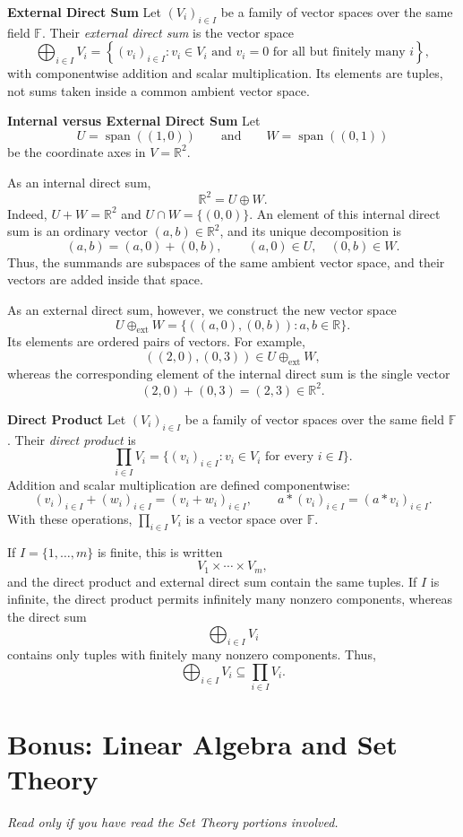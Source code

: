 \documentclass[a4paper,11pt,abstract=true]{scrartcl}
\theoremstyle{dotlessP}
\theoremstyle{dotlessS}
\theoremstyle{remark}
\theoremstyle{definition}
\begin{document}
\textbf{External Direct Sum} Let ${(V_i)}_{i\in I}$ be a family
of vector spaces over the same field $\mathbb{F}$. Their \emph{external direct sum} is
the vector space
\[
\bigoplus_{i\in I}V_i
=\left\{{(v_i)}_{i\in I}:v_i\in V_i
\text{ and }v_i=0\text{ for all but finitely many }i\right\},
\]
with componentwise addition and scalar multiplication. Its elements are
tuples, not sums taken inside a common ambient vector space.

\textbf{Internal versus External Direct Sum} Let
\[
U=\operatorname{span}((1,0))
\qquad\text{and}\qquad
W=\operatorname{span}((0,1))
\]
be the coordinate axes in $V=\mathbb{R}^2$.

As an internal direct sum,
\[
\mathbb{R}^2=U\oplus W.
\]
Indeed, $U+W=\mathbb{R}^2$ and $U\cap W=\{(0,0)\}$. An element of this
internal direct sum is an ordinary vector $(a,b)\in\mathbb{R}^2$, and its
unique decomposition is
\[
(a,b)=(a,0)+(0,b),
\qquad (a,0)\in U,\quad (0,b)\in W.
\]
Thus, the summands are subspaces of the same ambient vector space, and their
vectors are added inside that space.

As an external direct sum, however, we construct the new vector space
\[
U\oplus_{\mathrm{ext}}W
=\{((a,0),(0,b)):a,b\in\mathbb{R}\}.
\]
Its elements are ordered pairs of vectors. For example,
\[
((2,0),(0,3))\in U\oplus_{\mathrm{ext}}W,
\]
whereas the corresponding element of the internal direct sum is the single
vector
\[
(2,0)+(0,3)=(2,3)\in\mathbb{R}^2.
\]

\textbf{Direct Product} Let ${(V_i)}_{i\in I}$ be a family of
vector spaces over the same field $\mathbb{F}$. Their \emph{direct product} is
\[
\prod_{i\in I}V_i
=\{{(v_i)}_{i\in I}:v_i\in V_i\text{ for every }i\in I\}.
\]
Addition and scalar multiplication are defined componentwise:
\[
{(v_i)}_{i\in I}+{(w_i)}_{i\in I}={(v_i+w_i)}_{i\in I},
\qquad
a*{(v_i)}_{i\in I}={(a*v_i)}_{i\in I}.
\]
With these operations, $\prod_{i\in I}V_i$ is a vector space over $\mathbb{F}$.

If $I=\{1,\ldots,m\}$ is finite, this is written
\[
V_1\times\cdots\times V_m,
\]
and the direct product and external direct sum contain the same tuples. If
$I$ is infinite, the direct product permits infinitely many nonzero
components, whereas the direct sum
\[
\bigoplus_{i\in I}V_i
\]
contains only tuples with finitely many nonzero components. Thus,
\[
\bigoplus_{i\in I}V_i\subseteq\prod_{i\in I}V_i.
\]


\section{Bonus: Linear Algebra and Set Theory}
\textit{Read only if you have read the Set Theory portions involved.}
\end{document}
